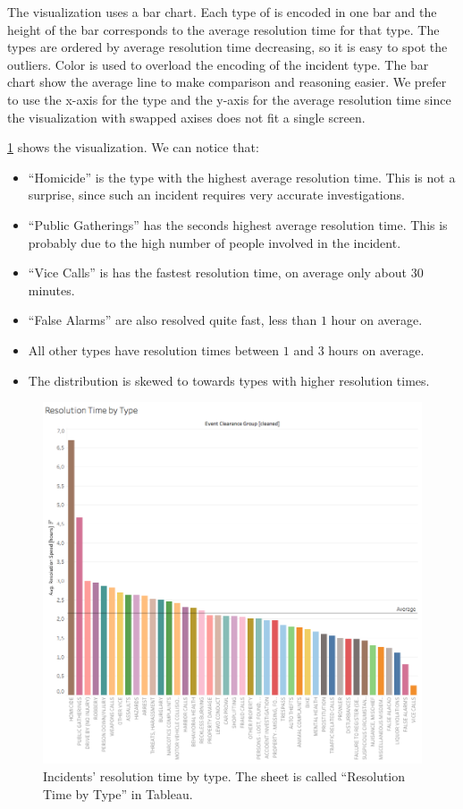 The visualization uses a bar chart.
Each type of is encoded in one bar and the height of the bar corresponds to the average resolution time for that type.
The types are ordered by average resolution time decreasing, so it is easy to spot the outliers.
Color is used to overload the encoding of the incident type.
The bar chart show the average line to make comparison and reasoning easier.
We prefer to use the x-axis for the type and the y-axis for the average resolution time since the visualization with swapped axises does not fit a single screen.

\cref{fig:3_2_resolution_speed_by_type} shows the visualization.
We can notice that:
\begin{itemize}
    \item ``Homicide'' is the type with the highest average resolution time. This is not a surprise, since such an incident requires very accurate investigations.
    \item ``Public Gatherings'' has the seconds highest average resolution time. This is probably due to the high number of people involved in the incident.
    \item ``Vice Calls'' is has the fastest resolution time, on average only about $30$ minutes.
    \item ``False Alarms'' are also resolved quite fast, less than $1$ hour on average.
    \item All other types have resolution times between $1$ and $3$ hours on average.
    \item The distribution is skewed to towards types with higher resolution times.
\end{itemize}

\begin{figure}[h]
	\centering
	\includegraphics[width=\columnwidth]{figures/3_2_resolution_speed_by_type}
	\caption{Incidents' resolution time by type. The sheet is called ``Resolution Time by Type'' in Tableau.}
	\label{fig:3_2_resolution_speed_by_type}
\end{figure}


